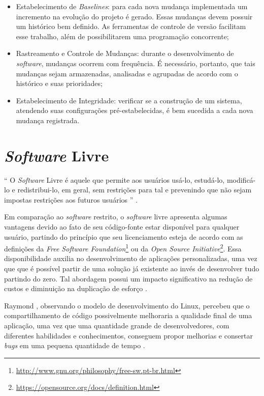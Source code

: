 \begin{itemize}
    \item Estabelecimento de \textit{Baselines}: para cada nova mudança implementada um incremento na evolução do projeto é gerado. Essas mudanças devem possuir um histórico bem definido. As ferramentas de controle de versão facilitam esse trabalho, além de possibilitarem uma programação concorrente;
    \item Rastreamento e Controle de Mudanças: durante o desenvolvimento de \textit{software}, mudanças ocorrem com frequência. É necessário, portanto, que tais mudanças sejam armazenadas, analisadas e agrupadas de acordo com o histórico e suas prioridades;
    \item Estabelecimento de Integridade: verificar se a construção de um sistema, atendendo suas configurações pré-estabelecidas, é bem sucedida a cada nova mudança registrada.
\end{itemize}

\section{\textit{Software} Livre}
`` O \textit{Software} Livre é aquele que permite aos usuários usá-lo, estudá-lo, modificá-lo e redistribui-lo, em geral, sem restrições para tal e prevenindo que não sejam impostas restrições aos futuros usuários '' \cite{meirelles2013}.

Em comparação ao \textit{software} restrito, o \textit{software} livre apresenta algumas vantagens devido ao fato de seu código-fonte estar disponível para qualquer usuário, partindo do princípio que seu licenciamento esteja de acordo com as definições da \textit{Free \textit{Software} Foundation}\footnote{\url{http://www.gnu.org/philosophy/free-sw.pt-br.html}} ou da \textit{Open Source Initiative}\footnote{\url{https://opensource.org/docs/definition.html}}. Essa disponibilidade auxilia no desenvolvimento de aplicações personalizadas, uma vez que que é possível partir de uma solução já existente ao invés de desenvolver tudo partindo do zero. Tal abordagem possui um impacto significativo na redução de custos e diminuição na duplicação de esforço \cite{meirelles2013}.

Raymond \cite{raymond1999}, observando o modelo de desenvolvimento do Linux, percebeu que o compartilhamento de código possivelmente melhoraria a qualidade final de uma aplicação, uma vez que uma quantidade grande de desenvolvedores, com diferentes habilidades e conhecimentos, conseguem propor melhorias e consertar \textit{bugs} em uma pequena quantidade de tempo \cite{meirelles2013}.

